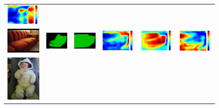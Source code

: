 \documentclass[10pt,twocolumn,letterpaper]{article}
\begin{document}
\begin{figure}
\begin{tabular}{c c c c c c}
   \includegraphics[height=0.085\linewidth]{fig/voc12/att3/2007_006802.pdf} \\
   \includegraphics[height=0.09\linewidth]{fig/voc12/img/2011_000070.jpg} &
   \includegraphics[height=0.09\linewidth]{fig/voc12/res_baseline/2011_000070.png} &
   \includegraphics[height=0.09\linewidth]{fig/voc12/res_sharenet/2011_000070.png} &
   \includegraphics[height=0.09\linewidth]{fig/voc12/att1/2011_000070.pdf} &
   \includegraphics[height=0.09\linewidth]{fig/voc12/att2/2011_000070.pdf} &
   \includegraphics[height=0.09\linewidth]{fig/voc12/att3/2011_000070.pdf} \\
   \includegraphics[height=0.13\linewidth]{fig/voc12/img/2011_002343.jpg} &

\end{tabular}
\end{figure}
\end{document}
